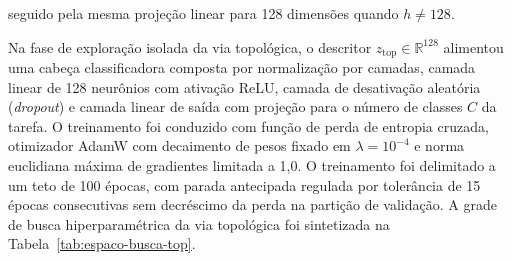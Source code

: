 seguido pela mesma projeção linear para 128 dimensões quando $h \neq 128$.

Na fase de exploração isolada da via topológica, o descritor $z_{\mathrm{top}} \in \mathbb{R}^{128}$ alimentou uma cabeça classificadora composta por normalização por camadas, camada linear de 128 neurônios com ativação ReLU, camada de desativação aleatória (\textit{dropout}) e camada linear de saída com projeção para o número de classes $C$ da tarefa. O treinamento foi conduzido com função de perda de entropia cruzada, otimizador AdamW com decaimento de pesos fixado em $\lambda = 10^{-4}$ e norma euclidiana máxima de gradientes limitada a 1,0. O treinamento foi delimitado a um teto de 100 épocas, com parada antecipada regulada por tolerância de 15 épocas consecutivas sem decréscimo da perda na partição de validação. A grade de busca hiperparamétrica da via topológica foi sintetizada na Tabela~\ref{tab:espaco-busca-top}.

\begin{table}[htb]
\centering
\caption{Espaço de busca de hiperparâmetros estratificado por conjunto de dados na via topológica.}
\label{tab:espaco-busca-top}
\small
{}
\end{table}


